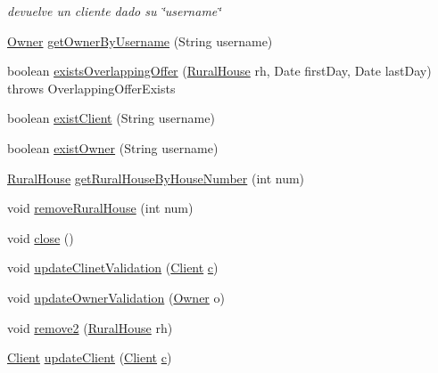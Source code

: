 \begin{DoxyCompactItemize}
\begin{DoxyCompactList}\small\item\em devuelve un cliente dado su \char`\"{}username\char`\"{} \end{DoxyCompactList}\item 
\mbox{\hyperlink{classdomain_1_1_owner}{Owner}} \mbox{\hyperlink{classdata_access_1_1_data_access_a61836150ad3401ad7e326f263993c7bc}{get\+Owner\+By\+Username}} (String username)
\item 
boolean \mbox{\hyperlink{classdata_access_1_1_data_access_ab6b1332b8bb17a4f65457043247d0b5e}{exists\+Overlapping\+Offer}} (\mbox{\hyperlink{classdomain_1_1_rural_house}{Rural\+House}} rh, Date first\+Day, Date last\+Day)  throws Overlapping\+Offer\+Exists 
\item 
boolean \mbox{\hyperlink{classdata_access_1_1_data_access_a0023d35ffec2c84262c6dad259f812ae}{exist\+Client}} (String username)
\item 
boolean \mbox{\hyperlink{classdata_access_1_1_data_access_a50b55de13fbd4c9848f7c3ee8a57db93}{exist\+Owner}} (String username)
\item 
\mbox{\hyperlink{classdomain_1_1_rural_house}{Rural\+House}} \mbox{\hyperlink{classdata_access_1_1_data_access_a652083447d2e9e5fd5b6228bc67a8ca4}{get\+Rural\+House\+By\+House\+Number}} (int num)
\item 
void \mbox{\hyperlink{classdata_access_1_1_data_access_a3317cddb0e49d7e884f5f89795e20317}{remove\+Rural\+House}} (int num)
\item 
void \mbox{\hyperlink{classdata_access_1_1_data_access_a58d3d443d0a2f5d74b6240248a257fd5}{close}} ()
\item 
void \mbox{\hyperlink{classdata_access_1_1_data_access_ad9bd59be12508bde6bffd40397ed6caa}{update\+Clinet\+Validation}} (\mbox{\hyperlink{classdomain_1_1_client}{Client}} \mbox{\hyperlink{classdata_access_1_1_data_access_ad09e2bb7e62d0624ad4ed15307cb2e3e}{c}})
\item 
void \mbox{\hyperlink{classdata_access_1_1_data_access_a5ecedf103c63cc76c84c664e29f64f7b}{update\+Owner\+Validation}} (\mbox{\hyperlink{classdomain_1_1_owner}{Owner}} o)
\item 
void \mbox{\hyperlink{classdata_access_1_1_data_access_ab4e4324392bb85a0f2a2c209f463d1fa}{remove2}} (\mbox{\hyperlink{classdomain_1_1_rural_house}{Rural\+House}} rh)
\item 
\mbox{\hyperlink{classdomain_1_1_client}{Client}} \mbox{\hyperlink{classdata_access_1_1_data_access_a403975bb8b87dbfa856d90ef362e7b60}{update\+Client}} (\mbox{\hyperlink{classdomain_1_1_client}{Client}} \mbox{\hyperlink{classdata_access_1_1_data_access_ad09e2bb7e62d0624ad4ed15307cb2e3e}{c}})

\end{DoxyCompactItemize}

